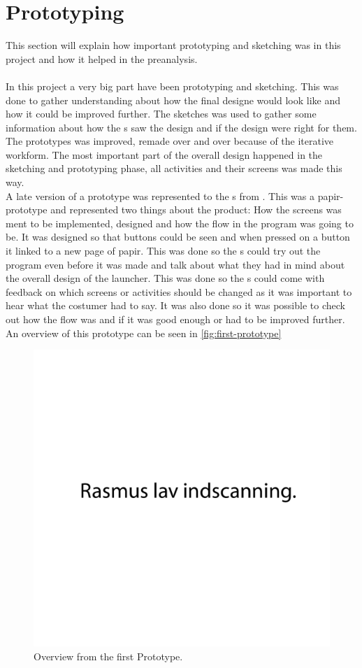 \section{Prototyping}
This section will explain how important prototyping and sketching was in this project and how it helped in the preanalysis. \\\\
In this project a very big part have been prototyping and sketching. This was done to gather understanding about how the final designe would look like and how it could be improved further. The sketches was used to gather some information about how the \guardian{}s saw the design and if the design were right for them. The prototypes was improved, remade over and over because of the iterative workform. The most important part of the overall design happened in the sketching and prototyping phase, all activities and their screens was made this way. \\
A late version of a prototype was represented to the \guardian{}s from \egebakken{}. This was a papir-prototype and represented two things about the product: How the screens was ment to be implemented, designed and how the flow in the program was going to be. It was designed so that buttons could be seen and when pressed on a button it linked to a new page of papir. This was done so the \guardian{}s could try out the program even before it was made and talk about what they had in mind about the overall design of the launcher.
This was done so the \guardian{}s could come with feedback on which screens or activities should be changed as it was important to hear what the costumer had to say. It was also done so it was possible to check out how the flow was and if it was good enough or had to be improved further. An overview of this prototype can be seen in \autoref{fig:first-prototype}

\begin{figure}[h!]
	\centering
	\includegraphics[width=1\textwidth]{gfx/first-prototype.pdf}
	\caption{Overview from the first Prototype.}
	\label{fig:first-prototype}
\end{figure}

